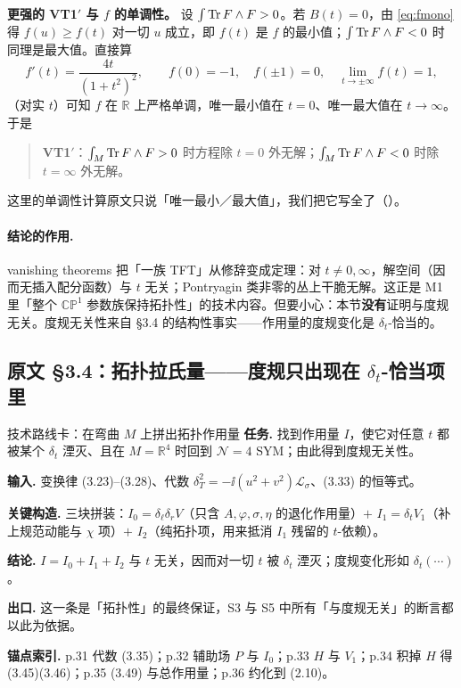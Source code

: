 \textbf{更强的 VT1$'$ 与 $f$ 的单调性。} 设 $\int\operatorname{Tr} F\wedge F>0$。若 $B(t)=0$，由 \eqref{eq:fmono} 得 $f(u)\ge f(t)$ 对一切 $u$ 成立，即 $f(t)$ 是 $f$ 的最小值；$\int\operatorname{Tr} F\wedge F<0$ 时同理是最大值。直接算
\begin{equation}
f'(t)=\frac{4t}{(1+t^2)^2},
\qquad
f(0)=-1,\quad f(\pm1)=0,\quad \lim_{t\to\pm\infty}f(t)=1,
\label{eq:fmono}
\end{equation}
（对实 $t$）可知 $f$ 在 $\mathbb R$ 上严格单调，唯一最小值在 $t=0$、唯一最大值在 $t\to\infty$。于是\pA{}
\begin{quote}
\textbf{VT1$'$}：$\int_M\operatorname{Tr} F\wedge F>0$ 时方程除 $t=0$ 外无解；$\int_M\operatorname{Tr} F\wedge F<0$ 时除 $t=\infty$ 外无解。
\end{quote}
这里的单调性计算原文只说「唯一最小／最大值」，我们把它写全了（\pB）。

\paragraph{结论的作用.}
vanishing theorems 把「一族 TFT」从修辞变成定理：对 $t\ne0,\infty$，解空间（因而无插入配分函数）与 $t$ 无关；Pontryagin 类非零的丛上干脆无解。这正是 M1 里「整个 $\mathbb{CP}^1$ 参数族保持拓扑性」的技术内容\pC{}。但要小心：本节\textbf{没有}证明与度规无关。度规无关性来自 §3.4 的结构性事实——作用量的度规变化是 $\delta_t$-恰当的\pB。


\subsection{原文 §3.4：拓扑拉氏量——度规只出现在 $\delta_t$-恰当项里}

\begin{kcard}{技术路线卡：在弯曲 $M$ 上拼出拓扑作用量}
\textbf{任务.} 找到作用量 $I$，使它对任意 $t$ 都被某个 $\delta_t$ 湮灭、且在 $M=\mathbb R^4$ 时回到 $\mathcal N=4$ SYM；由此得到度规无关性。

\textbf{输入.} 变换律 (3.23)–(3.28)、代数 $\delta_T^2=-\ii(u^2+v^2)\mathcal L_\sigma$、(3.33) 的恒等式。

\textbf{关键构造.} 三块拼装：$I_0=\delta_\ell\delta_r V$（只含 $A,\varphi,\sigma,\eta$ 的退化作用量）$+$ $I_1=\delta_t V_1$（补上规范动能与 $\chi$ 项）$+$ $I_2$（纯拓扑项，用来抵消 $I_1$ 残留的 $t$-依赖）。

\textbf{结论.} $I=I_0+I_1+I_2$ 与 $t$ 无关，因而对一切 $t$ 被 $\delta_t$ 湮灭；度规变化形如 $\delta_t(\cdots)$。

\textbf{出口.} 这一条是「拓扑性」的最终保证，S3 与 S5 中所有「与度规无关」的断言都以此为依据。

\textbf{锚点索引.} p.31 代数 (3.35)；p.32 辅助场 $P$ 与 $I_0$；p.33 $H$ 与 $V_1$；p.34 积掉 $H$ 得 (3.45)(3.46)；p.35 (3.49) 与总作用量；p.36 约化到 (2.10)。
\end{kcard}

